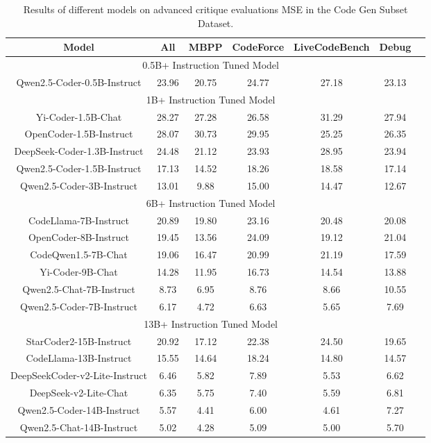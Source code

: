 \documentclass[11pt, a4paper, logo, copyright, nonumbering, amsart]{map}
\begin{document}
\begin{CJK*}{UTF8}{gbsn}
\begin{table*}[h!]
    \centering
    \caption{Results of different models on advanced critique evaluations MSE in the Code Gen Subset Dataset.} \label{table:algo_level2}
    \begin{adjustbox}{width=0.8\textwidth}
    \begin{tabular}{c|cccccc}
    
    \toprule
    \textbf{Model} & \textbf{All} & \textbf{MBPP} & \textbf{CodeForce} & \textbf{LiveCodeBench} & \textbf{Debug} & \\

    \midrule
    \multicolumn{6}{c}{0.5B+ Instruction Tuned Model} \\
    \midrule
    Qwen2.5-Coder-0.5B-Instruct & 23.96 & 20.75 & 24.77 & 27.18 & 23.13 \\
    
    \midrule
    \multicolumn{6}{c}{1B+ Instruction Tuned Model} \\
    \midrule
    Yi-Coder-1.5B-Chat & 28.27 & 27.28 & 26.58 & 31.29 & 27.94 \\
    OpenCoder-1.5B-Instruct & 28.07 & 30.73 & 29.95 & 25.25 & 26.35 \\
    DeepSeek-Coder-1.3B-Instruct & 24.48 & 21.12 & 23.93 & 28.95 & 23.94 \\
    Qwen2.5-Coder-1.5B-Instruct & 17.13 & 14.52 & 18.26 & 18.58 & 17.14 \\
    Qwen2.5-Coder-3B-Instruct & 13.01 & 9.88 & 15.00 & 14.47 & 12.67 \\

    \midrule
    \multicolumn{6}{c}{6B+ Instruction Tuned Model} \\
    \midrule
    CodeLlama-7B-Instruct & 20.89 & 19.80 & 23.16 & 20.48 & 20.08 \\
    OpenCoder-8B-Instruct & 19.45 & 13.56 & 24.09 & 19.12 & 21.04 \\
    CodeQwen1.5-7B-Chat & 19.06 & 16.47 & 20.99 & 21.19 & 17.59 \\
    Yi-Coder-9B-Chat & 14.28 & 11.95 & 16.73 & 14.54 & 13.88 \\
    Qwen2.5-Chat-7B-Instruct & 8.73 & 6.95 & 8.76 & 8.66 & 10.55 \\
    Qwen2.5-Coder-7B-Instruct & 6.17 & 4.72 & 6.63 & 5.65 & 7.69 \\

    \midrule
    \multicolumn{6}{c}{13B+ Instruction Tuned Model} \\
    \midrule
    StarCoder2-15B-Instruct & 20.92 & 17.12 & 22.38 & 24.50 & 19.65 \\
    CodeLlama-13B-Instruct & 15.55 & 14.64 & 18.24 & 14.80 & 14.57 \\
    DeepSeekCoder-v2-Lite-Instruct & 6.46 & 5.82 & 7.89 & 5.53 & 6.62 \\
    DeepSeek-v2-Lite-Chat & 6.35 & 5.75 & 7.40 & 5.59 & 6.81 \\
    Qwen2.5-Coder-14B-Instruct & 5.57 & 4.41 & 6.00 & 4.61 & 7.27 \\
    Qwen2.5-Chat-14B-Instruct & 5.02 & 4.28 & 5.09 & 5.00 & 5.70 \\


\end{tabular}
\end{adjustbox}
\end{table*}
\end{CJK*}
\end{document}

